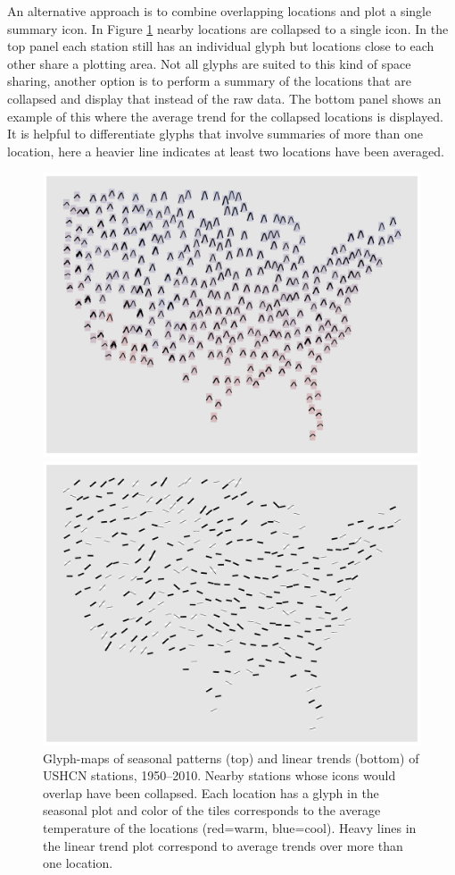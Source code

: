 \documentclass[oneside]{article}
\begin{document}
An alternative approach is to combine overlapping locations and plot a single summary icon.  In Figure \ref{fig:irregular-collapsed} nearby locations are collapsed to a single icon.  In the top panel each station still has an individual glyph but locations close to each other share a plotting area.  Not all glyphs are suited to this kind of space sharing, another option is to perform a summary of the locations that are collapsed and display that instead of the raw data.  The bottom panel shows an example of this where the average trend for the collapsed locations is displayed.  It is helpful to differentiate glyphs that involve summaries of more than one location, here a heavier line indicates at least two locations have been averaged.

\begin{figure}[htbp]
  \centering
  \includegraphics[width=0.95\linewidth]{usa-season-collapsed}%

  \includegraphics[width=0.95\linewidth]{usa-lin-collapse}%
  \caption{Glyph-maps of seasonal patterns (top) and linear trends (bottom) of USHCN stations, 1950--2010.  Nearby stations whose icons would overlap have been collapsed.  Each location has a glyph in the seasonal plot and color of the tiles corresponds to the average temperature of the locations (red=warm, blue=cool).  Heavy lines in the linear trend plot correspond to average trends over more than one location.}
  \label{fig:irregular-collapsed}
\end{figure}
\end{document}

